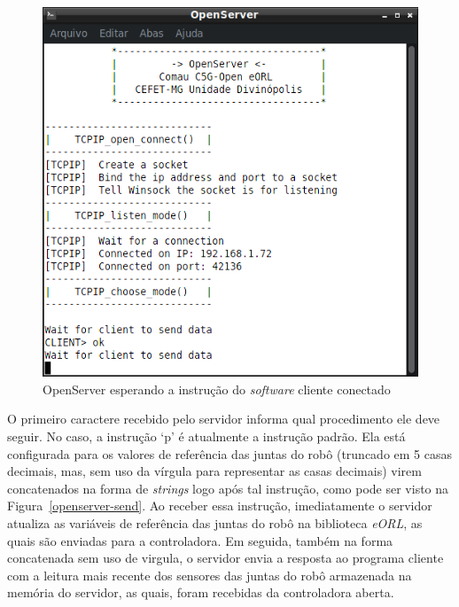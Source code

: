         \begin{figure}[ht]
            \centering
            \includegraphics[width=\columnwidth]{imagens/Softwares/openserver-ok_.png}
            \small 
            \centering 
            \caption{OpenServer esperando a instrução do \textit{software} cliente conectado}
            \label{openserver-ok}
        \end{figure}
        
        O primeiro caractere recebido pelo servidor informa qual procedimento ele deve seguir. No caso, a instrução `p' é atualmente a instrução padrão. Ela está configurada para os valores de referência das juntas do robô (truncado em 5 casas decimais, mas, sem uso da vírgula para representar as casas decimais) virem concatenados na forma de \textit{strings} logo após tal instrução, como pode ser visto na Figura~\ref{openserver-send}. Ao receber essa instrução, imediatamente o servidor atualiza as variáveis de referência das juntas do robô na biblioteca \textit{eORL}, as quais são enviadas para a controladora. Em seguida, também na forma concatenada sem uso de virgula, o servidor envia a resposta ao programa cliente com a leitura mais recente dos sensores das juntas do robô armazenada na memória do servidor, as quais, foram recebidas da controladora aberta.
        
